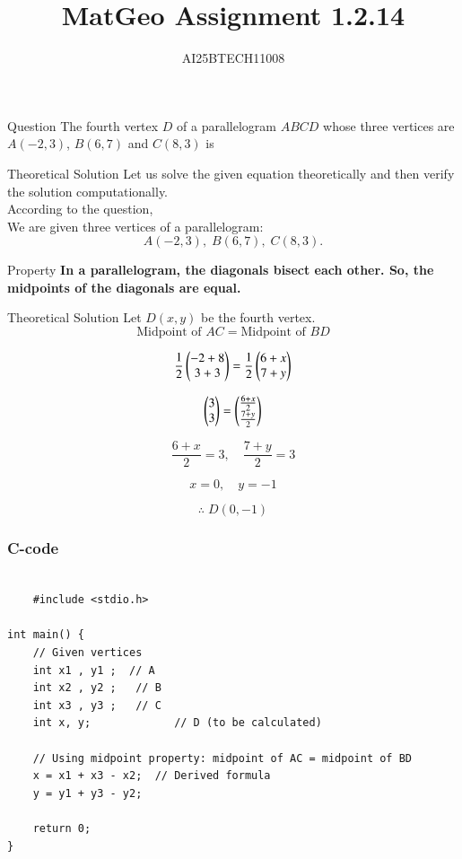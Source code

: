 \documentclass{beamer}
\title 
{MatGeo Assignment 1.2.14}
\author
{AI25BTECH11008}
\begin{document}
\frame{\titlepage}

\begin{frame}{Question}
The fourth vertex $D$ of a parallelogram $ABCD$ whose three vertices are 
$A(-2,3)$, $B(6,7)$ and $C(8,3)$ is
\end{frame}

\begin{frame}{Theoretical Solution}
\noindent
Let us solve the given equation theoretically and then verify the solution computationally. \\
According to the question, \\

We are given three vertices of a parallelogram:
$$A(-2,3), \; B(6,7), \; C(8,3).$$
\end{frame}

\begin{frame}{Property}
\textbf{In a parallelogram, the diagonals bisect each other. So, the midpoints of the diagonals are equal.}
\end{frame}

\begin{frame}{Theoretical Solution}
Let $D(x,y)$ be the fourth vertex. \\

\[
\text{Midpoint of } AC = \text{Midpoint of } BD
\]

\[
\frac{1}{2}
\begin{pmatrix}
-2+8 \\
3+3
\end{pmatrix}
=
\frac{1}{2}
\begin{pmatrix}
6+x \\
7+y
\end{pmatrix}
\]

\[
\begin{pmatrix}
3 \\
3
\end{pmatrix}
=
\begin{pmatrix}
\frac{6+x}{2} \\
\frac{7+y}{2}
\end{pmatrix}
\]

\[
\frac{6+x}{2} = 3, \quad \frac{7+y}{2} = 3
\]

\[
x = 0, \quad y = -1
\]

\[
\therefore \; D(0,-1)
\]
\end{frame}

\begin{frame}[fragile]
\frametitle{C-code}
\begin{lstlisting}
    
    #include <stdio.h>

int main() {
    // Given vertices
    int x1 , y1 ;  // A
    int x2 , y2 ;   // B
    int x3 , y3 ;   // C
    int x, y;             // D (to be calculated)

    // Using midpoint property: midpoint of AC = midpoint of BD
    x = x1 + x3 - x2;  // Derived formula
    y = y1 + y3 - y2;

    return 0;
}

\end{lstlisting}
\end{frame}
\end{document}
